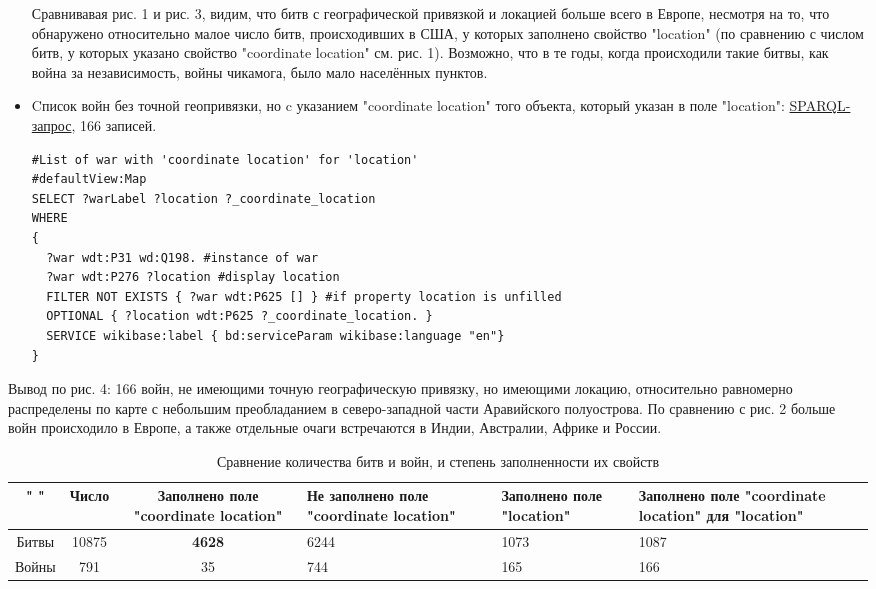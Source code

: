 \begin{itemize}
Сравнивавая рис. 1 и рис. 3, видим, что битв с географической привязкой и локацией больше всего в Европе, несмотря на то, что обнаружено относительно малое число битв, происходивших в США, у которых заполнено свойство "location" (по сравнению с числом битв, у которых указано свойство "coordinate location" см. рис. 1). Возможно, что в те годы, когда происходили такие битвы, как война за независимость, войны чикамога, было мало населённых пунктов.

\item{Cписок войн без точной геопривязки, но c указанием "coordinate location" того объекта, который указан в поле "location":} \href{https://query.wikidata.org/#%23List%20of%20war%20with%20unfilled%20property%20%27location%27%20%0A%23defaultView%3AMap%0ASELECT%20%3FwarLabel%20%3Flocation%20%3F_coordinate_location%0AWHERE%0A%7B%0A%20%20%3Fwar%20wdt%3AP31%20wd%3AQ198.%20%23instance%20of%20war%0A%20%20%3Fwar%20wdt%3AP276%20%3Flocation%20%23display%20location%0A%20%20FILTER%20NOT%20EXISTS%20%7B%20%3Fwar%20wdt%3AP625%20%5B%5D%20%7D%20%23if%20property%20location%20is%20unfilled%0A%20%20OPTIONAL%20%7B%20%3Flocation%20wdt%3AP625%20%3F_coordinate_location.%20%7D%0A%20%20SERVICE%20wikibase%3Alabel%20%7B%20bd%3AserviceParam%20wikibase%3Alanguage%20%22en%22%7D%0A%7D}{ SPARQL-запрос}, 166 записей.
\begin{lstlisting}[language=SPARQL]
#List of war with 'coordinate location' for 'location'
#defaultView:Map
SELECT ?warLabel ?location ?_coordinate_location
WHERE
{
  ?war wdt:P31 wd:Q198. #instance of war
  ?war wdt:P276 ?location #display location
  FILTER NOT EXISTS { ?war wdt:P625 [] } #if property location is unfilled
  OPTIONAL { ?location wdt:P625 ?_coordinate_location. }
  SERVICE wikibase:label { bd:serviceParam wikibase:language "en"}
}
\end{lstlisting}
\end{itemize}

Вывод по рис. 4: 166 войн, не имеющими точную географическую привязку, но имеющими локацию, относительно равномерно распределены по карте с небольшим преобладанием в северо-западной части Аравийского полуострова. По сравнению с рис. 2 больше войн происходило в Европе, а также отдельные очаги встречаются в Индии, Австралии, Африке и России.

\begin{table}[H]
\caption{Сравнение количества битв и войн, и степень заполненности их свойств}
\label{tabular:timesandtenses}
\begin{center}
\begin{tabular}{ccc}
\hline
" " & Число & Заполнено поле "coordinate location" &  Не заполнено поле "coordinate location" & Заполнено поле "location" & Заполнено поле "coordinate location" для "location"\\ \hline
Битвы & 10875 & \textbf{4628} & 6244 & 1073 & 1087 \\ \hline
Войны & 791 & 35 & 744 & 165 & 166 \\ \hline
\end{tabular}
\end{center}
\end{table}


